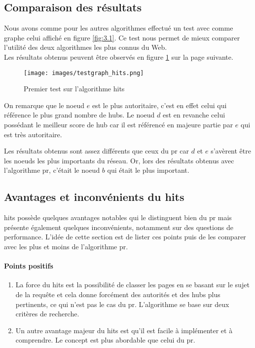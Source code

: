 \documentclass[12pt,twoside, openright]{memoir}
\begin{document}
	\subsection{Comparaison des résultats}
	Nous avons comme pour les autres algorithmes effectué un test avec comme graphe celui affiché en figure \ref{fig:3.1}. Ce test nous permet de mieux comparer l'utilité des deux algorithmes les plus connus du Web.\\
	Les résultats obtenus peuvent être observés en figure \ref{hitsgraph} sur la page suivante.\newpage
	\begin{figure}[!ht]
		\centering
		\texttt{[image: images/testgraph\_hits.png]}
		\caption{Premier test sur l'algorithme \gls{hits}}
		\label{hitsgraph}
	\end{figure}\par
	On remarque que le noeud $e$ est le plus autoritaire, c'est en effet celui qui référence le plus grand nombre de hubs. Le noeud $d$ est en revanche celui possédant le meilleur score de hub car il est référencé en majeure partie par $e$ qui est très autoritaire.\par
	Les résultats obtenus sont assez différents que ceux du \gls{pr} car $d$ et $e$ s'avèrent être les noeuds les plus importants du réseau. Or, lors des résultats obtenus avec l'algorithme \gls{pr}, c'était le noeud $b$ qui était le plus important.
	\subsection{Avantages et inconvénients du \gls{hits}}
	\gls{hits} possède quelques avantages notables qui le distinguent bien du \gls{pr} mais présente également quelques inconvénients, notamment sur des questions de performance. L'idée de cette section est de lister ces points puis de les comparer avec les plus et moins de l'algorithme \gls{pr}.
	\paragraph*{Points positifs}
	\begin{enumerate}
		\item La force du \gls{hits} est la possibilité de classer les pages en se basant sur le sujet de la requête et cela donne forcément des autorités et des hubs plus pertinents, ce qui n'est pas le cas du \gls{pr}. L'algorithme se base sur deux critères de recherche.
		\item Un autre avantage majeur du \gls{hits} est qu'il est facile à implémenter et à comprendre. Le concept est plus abordable que celui du \gls{pr}.
	\end{enumerate}
\end{document}
